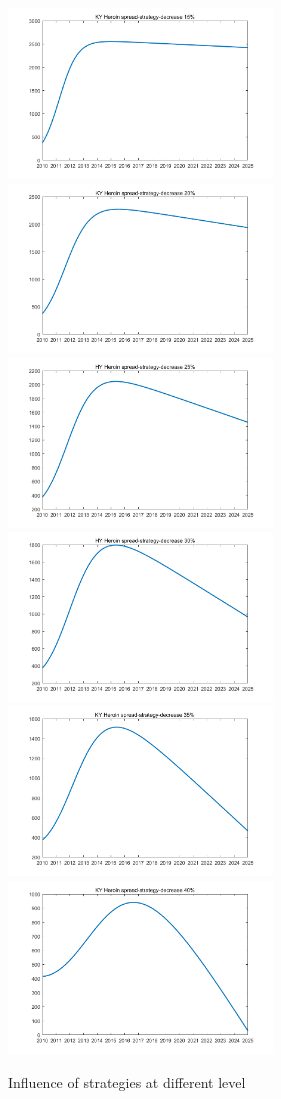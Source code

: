 \documentclass[12pt]{article}
\begin{document}
\begin{figure}[!htbp]
\small
\centering
\includegraphics[width=7cm]{Fig/15_percent.png}
\includegraphics[width=7cm]{Fig/20_percent.png}
\includegraphics[width=7cm]{Fig/25_percent.png}
\includegraphics[width=7cm]{Fig/30_percent.png}
\includegraphics[width=7cm]{Fig/35_percent.png}
\includegraphics[width=7cm]{Fig/40_percent.png}
\caption{Influence of strategies at different level}
\end{figure}
\end{document}
